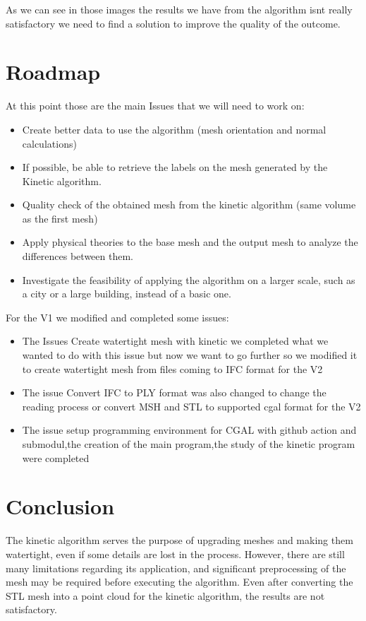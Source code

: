\documentclass{article}
\begin{document}
As we can see in those images the results we have from the 
algorithm isnt really satisfactory we need to find a solution 
to improve the quality of the outcome.


\section{Roadmap}
At this point those are the main Issues that we will need to work on:
\begin{itemize}
  \item Create better data to use the algorithm (mesh orientation and normal calculations)
  \item If possible, be able to retrieve the labels on the mesh generated by the Kinetic algorithm.
  \item Quality check of the obtained mesh from the kinetic algorithm (same volume as the first mesh)
  \item Apply physical theories to the base mesh and the output mesh to analyze the differences between them.
  \item Investigate the feasibility of applying the algorithm on a larger scale, such as a city or a large building, instead of a basic one.
\end{itemize}

For the V1 we modified and completed some issues:
\begin{itemize}
  \item The Issues Create watertight mesh with kinetic we completed what we wanted to do with this issue but now we want to go further so we modified it 
  to create watertight mesh from files coming to IFC format for the V2
  \item The issue Convert IFC to PLY format was also changed to change the reading process or convert MSH and STL to supported cgal format for the V2
  \item The issue setup programming environment for CGAL with github action and submodul,the creation of the main program,the study of the kinetic program were completed 
\end{itemize}



\section{Conclusion}
The kinetic algorithm serves the purpose of upgrading meshes and making them watertight, even if some details are lost in the process. However, 
there are still many limitations regarding its application, and significant preprocessing of the mesh may be required before executing the algorithm. 
Even after converting the STL mesh into a point cloud for the kinetic algorithm, the results are not satisfactory.
\end{document}

